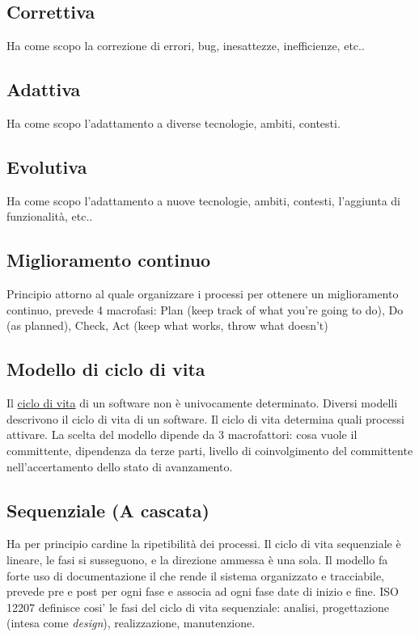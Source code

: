 		\subsection{Correttiva}
		Ha come scopo la correzione di errori, bug, inesattezze, inefficienze, etc..
		
		\subsection{Adattiva}
		Ha come scopo l'adattamento a diverse tecnologie, ambiti, contesti.
		
		\subsection{Evolutiva}
		Ha come scopo l'adattamento a nuove tecnologie, ambiti, contesti, l'aggiunta di funzionalità, etc..

	\subsection{Miglioramento continuo}
	\label{sec:miglioramentocontinuo}
	Principio attorno al quale organizzare i processi per ottenere un miglioramento continuo, prevede 4 macrofasi:
	Plan (keep track of what you're going to do), Do (as planned), Check, Act (keep what works, throw what doesn't)
		
	\subsection{Modello di ciclo di vita}
	\label{sec:modelliciclodivita}
	Il \hyperref[sec:ciclodivita]{ciclo di vita} di un software non è univocamente determinato. Diversi modelli descrivono il ciclo di vita di un software.
	Il ciclo di vita determina quali processi attivare. La scelta del modello dipende da 3 macrofattori: cosa vuole il committente, dipendenza da terze parti, livello di coinvolgimento del committente nell'accertamento dello stato di avanzamento.
	
		\subsection{Sequenziale (A cascata)}
			Ha per principio cardine la ripetibilità dei processi.
			Il ciclo di vita sequenziale è lineare, le fasi si susseguono, e la direzione
			ammessa è una sola.
			Il modello fa forte uso di documentazione il che rende il sistema organizzato e tracciabile, prevede pre e post per ogni fase e associa ad ogni fase date di inizio e fine.  
ISO 12207 definisce cosi' le fasi del ciclo di vita sequenziale: analisi, progettazione (intesa come \textit{design}), realizzazione, manutenzione. 		
		
